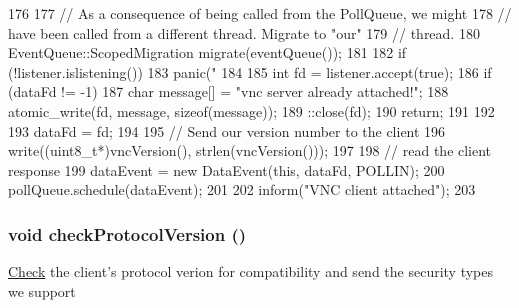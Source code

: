 \begin{DoxyCode}
176 {
177     // As a consequence of being called from the PollQueue, we might
178     // have been called from a different thread. Migrate to "our"
179     // thread.
180     EventQueue::ScopedMigration migrate(eventQueue());
181 
182     if (!listener.islistening())
183         panic("%
184 
185     int fd = listener.accept(true);
186     if (dataFd != -1) {
187         char message[] = "vnc server already attached!\n";
188         atomic_write(fd, message, sizeof(message));
189         ::close(fd);
190         return;
191     }
192 
193     dataFd = fd;
194 
195     // Send our version number to the client
196     write((uint8_t*)vncVersion(), strlen(vncVersion()));
197 
198     // read the client response
199     dataEvent = new DataEvent(this, dataFd, POLLIN);
200     pollQueue.schedule(dataEvent);
201 
202     inform("VNC client attached\n");
203 }
\end{DoxyCode}
\hypertarget{classVncServer_aee7430db7799cf4e0bac388671be878d}{
\subsubsection[{checkProtocolVersion}]{\setlength{\rightskip}{0pt plus 5cm}void checkProtocolVersion ()}}
\label{classVncServer_aee7430db7799cf4e0bac388671be878d}
\hyperlink{classCheck}{Check} the client's protocol verion for compatibility and send the security types we support 


